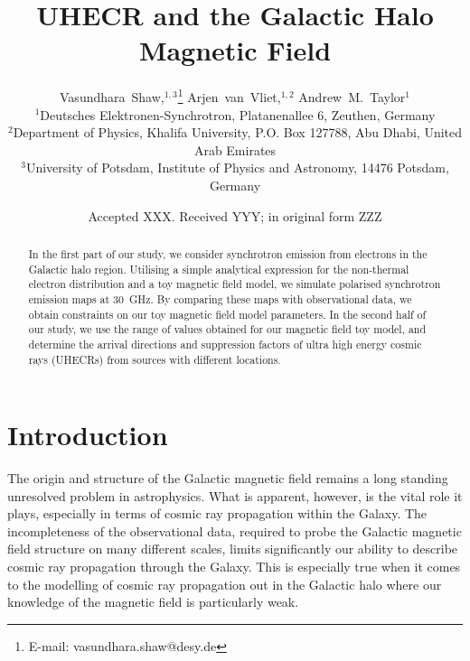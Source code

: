 \documentclass[usenatbib]{mnras}
\title{UHECR and the Galactic Halo Magnetic Field}
\author[V.~Shaw et al.]{
Vasundhara~Shaw,$^{1,3}$\thanks{E-mail: vasundhara.shaw@desy.de}
Arjen~van~Vliet,$^{1,2}$
Andrew~M.~Taylor$^{1}$
\\
$^{1}$Deutsches Elektronen-Synchrotron, Platanenallee 6, Zeuthen, Germany \\ %
$^{2}$Department of Physics, Khalifa University, P.O. Box 127788, Abu Dhabi, United Arab Emirates \\
$^{3}$University of Potsdam, Institute of Physics and Astronomy, 14476 Potsdam, Germany
}
\date{Accepted XXX. Received YYY; in original form ZZZ}
\begin{document}
\maketitle

\begin{abstract}
In the first part of our study, we consider synchrotron emission from electrons in the Galactic halo region. Utilising a simple analytical expression for the non-thermal electron distribution and a toy magnetic field model, we simulate polarised synchrotron emission maps at 30~GHz. By comparing these maps with observational data, we obtain constraints on our toy magnetic field model parameters. In the second half of our study, we use the range of values obtained for our magnetic field toy model, and determine the arrival directions and suppression factors of ultra high energy cosmic rays (UHECRs) from sources with different locations.
\end{abstract}



\section{Introduction}
\label{Introducion}

The origin and structure of the Galactic magnetic field remains a long standing unresolved problem in astrophysics. What is apparent, however, is the vital role it plays, especially in terms of cosmic ray propagation within the Galaxy. The incompleteness of the observational data, required to probe the Galactic magnetic field structure on many different scales, limits significantly our ability to describe cosmic ray propagation through the Galaxy. This is especially true when it comes to the modelling of cosmic ray propagation out in the Galactic halo where our knowledge of the magnetic field is particularly weak.
\end{document}
